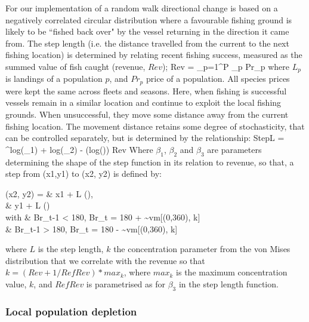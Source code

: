 \documentclass[review]{elsarticle}
\let\oldequation\equation
\let\oldendequation\endequation
\renewenvironment{equation}
 {\linenomathNonumbers\oldequation}
 {\oldendequation\endlinenomath}
\begin{document}
For our implementation of a random walk directional change is based on a
negatively correlated circular distribution where a favourable fishing ground
is likely to be ``fished back over" by the vessel returning in the direction it
came from.  The step length (i.e. the distance travelled from the current to
the next fishing location) is determined by relating recent
fishing success, measured as the summed value of fish caught (revenue, $Rev$);
\begin{equation}
Rev = \sum_{p=1}^{P} _{p} \cdot Pr_{p} 
\end{equation}
where $L_{p}$ is landings of a population $p$, and $Pr_{p}$ price of a
population. All species prices were kept the same across fleets and seasons.
Here, when fishing is successful vessels remain in a similar location and
continue to exploit the local fishing grounds. When unsuccessful, they move
some distance away from the current fishing location.  The movement distance
retains some degree of stochasticity, that can be controlled separately, but is
determined by the relationship: 
\begin{equation}
	StepL = ^{log(\beta_{1}) + log(\beta_{2}) -
		\left(log\left(\right)\right)} \cdot Rev
\end{equation}
Where $\beta_{1}$, $\beta_{2}$ and $\beta_{3}$ are parameters determining the
shape of the step function in its relation to revenue, so that, a step from
(x1,y1) to (x2, y2) is defined by:
\begin{equation}
	\begin{split}
 (x2, y2) =  & x1 + L \cdot \cos \left(\right), \\
             & y1 + L \cdot \sin \left(\right) \\	
 with  \hspace{0.5cm}     & Br_{t-1} < 180, Br_{t} = 180 + \sim vm[(0,360), k] \\
 			  & Br_{t-1} > 180, Br_{t} = 180 - \sim vm[(0,360), k] \\
	\end{split}
\end{equation}
where $L$ is the step length, $k$ the concentration parameter from the von
Mises distribution that we correlate with the revenue so
that $k = (Rev + 1 / RefRev) * max_{k}$, where $max_{k}$ is the maximum
concentration value, $k$, and $RefRev$ is parametrised as for $\beta_{3}$ in
the step length function. 

\subsubsection{Local population depletion}
\end{document}
